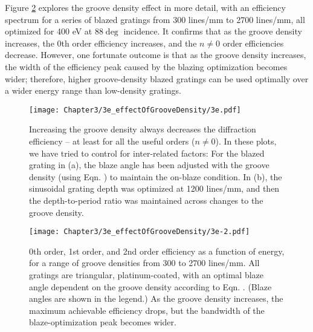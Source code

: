 Figure \ref{3e-2} explores the groove density effect in more detail, with an efficiency spectrum for a series of blazed gratings from 300 lines/mm to 2700 lines/mm, all optimized for 400 eV at 88$\deg$ incidence.  It confirms that as the groove density increases, the 0th order efficiency increases, and the $n\neq0$ order efficiencies decrease.  However, one fortunate outcome is that as the groove density increases, the width of the efficiency peak caused by the blazing optimization becomes wider; therefore, higher groove-density blazed gratings can be used optimally over a wider energy range than low-density gratings.
	
\begin{figure}[htbp] %
   \centering
   \texttt{[image: Chapter3/3e\_effectOfGrooveDensity/3e.pdf]} 
   \caption[Increasing the groove density always decreases the diffraction efficiency -- at least for all the useful orders ($n \neq 0$).]{Increasing the groove density always decreases the diffraction efficiency -- at least for all the useful orders ($n \neq 0$).  In these plots, we have tried to control for inter-related factors: For the blazed grating in (a), the blaze angle has been adjusted with the groove density (using Eqn. \protect {}) to maintain the on-blaze condition.  In (b), the sinusoidal grating depth was optimized at 1200 lines/mm, and then the depth-to-period ratio was maintained across changes to the groove density.}
   \label{3e}
\end{figure}

\begin{figure}[htbp] %
   \centering
   \texttt{[image: Chapter3/3e\_effectOfGrooveDensity/3e-2.pdf]} 
   \caption[0th order, 1st order, and 2nd order efficiency as a function of energy, for a range of groove densities from 300 to 2700 lines/mm. As the groove density increases, the maximum achievable efficiency drops, but the bandwidth of the blaze-optimization peak becomes wider.]{0th order, 1st order, and 2nd order efficiency as a function of energy, for a range of groove densities from 300 to 2700 lines/mm.  All gratings are triangular, platinum-coated, with an optimal blaze angle dependent on the groove density according to Eqn. \protect {}.  (Blaze angles are shown in the legend.)  As the groove density increases, the maximum achievable efficiency drops, but the bandwidth of the blaze-optimization peak becomes wider.}
   \label{3e-2}
\end{figure}

